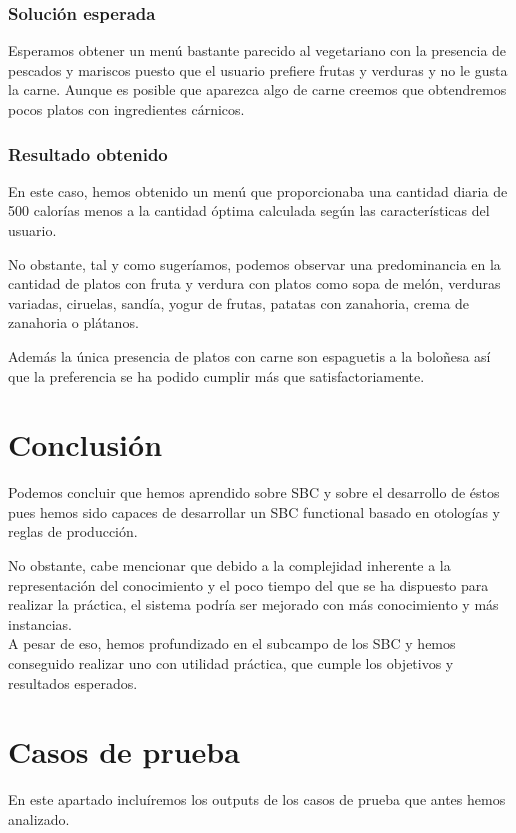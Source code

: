 \documentclass[11]{article}
\begin{document}
\subsubsection{Solución esperada}
Esperamos obtener un menú bastante parecido al vegetariano con la presencia de pescados y mariscos puesto que el usuario prefiere frutas y verduras y no le gusta la carne. Aunque es posible que aparezca algo de carne creemos que obtendremos pocos platos con ingredientes cárnicos. 

\subsubsection{Resultado obtenido}

En este caso, hemos obtenido un menú que proporcionaba una cantidad diaria de 500 calorías menos a la cantidad óptima calculada según las características del usuario. 

No obstante, tal y como sugeríamos, podemos observar una predominancia en la cantidad de platos con fruta y verdura con platos como sopa de melón, verduras variadas, ciruelas, sandía, yogur de frutas, patatas con zanahoria, crema de zanahoria o plátanos. 

Además la única presencia de platos con carne son espaguetis a la boloñesa así que la preferencia se ha podido cumplir más que satisfactoriamente. 

\section{Conclusión}
Podemos concluir que hemos aprendido sobre SBC y sobre el desarrollo de éstos pues hemos sido capaces de desarrollar un SBC functional basado en otologías y reglas de producción.

No obstante, cabe mencionar que debido a la complejidad inherente a la representación del conocimiento y el poco tiempo del que se ha dispuesto para realizar la práctica, el sistema podría ser mejorado con más conocimiento y más instancias. 
\\

A pesar de eso, hemos profundizado en el subcampo de los SBC y hemos conseguido realizar uno con utilidad práctica, que cumple los objetivos y resultados esperados.

\newpage
\appendix
\appendixpage
\addappheadtotoc
\section{Casos de prueba}
En este apartado incluíremos los outputs de los casos de prueba que antes hemos analizado.
\end{document}
